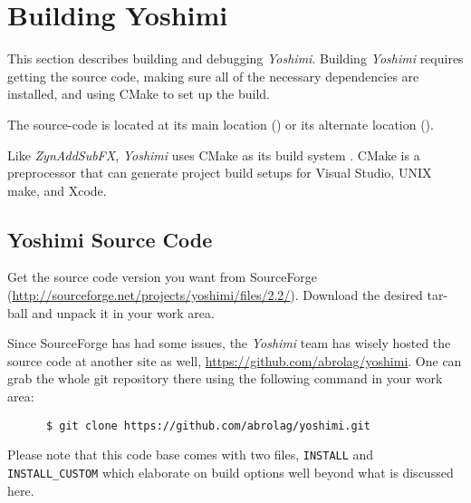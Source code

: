 %
%
%

\section{Building Yoshimi}
\label{sec:yoshimi_build}

   This section describes building and debugging \textsl{Yoshimi}.
   Building \textsl{Yoshimi} requires getting the source code, making sure
   all of the necessary dependencies are installed, and using CMake to set
   up the build.

   The source-code is located at its main location (\cite{yoshimi})
   or its alternate location (\cite{yoshimi2}).

   Like \textsl{ZynAddSubFX}, \textsl{Yoshimi} uses CMake as its build
   system \cite{zyncmake}.  CMake is a preprocessor that can generate
   project build setups for Visual Studio, UNIX make, and Xcode.

\subsection{Yoshimi Source Code}
\label{subsec:yoshimi_source_code}

   Get the source code version you want from SourceForge
   (\url{http://sourceforge.net/projects/yoshimi/files/2.2/}).
   Download the desired tar-ball and unpack it in your work area.

   Since SourceForge has had some issues, the \textsl{Yoshimi} team
   has wisely hosted the source code at another site as well,
   \url{https://github.com/abrolag/yoshimi}.  One can grab the whole
   git repository there using the following command in your work area:

   \begin{verbatim}
      $ git clone https://github.com/abrolag/yoshimi.git
   \end{verbatim}

   Please note that this code base comes with two files,
   \texttt{INSTALL} and \texttt{INSTALL\_CUSTOM} which elaborate on
   build options well beyond what is discussed here.

